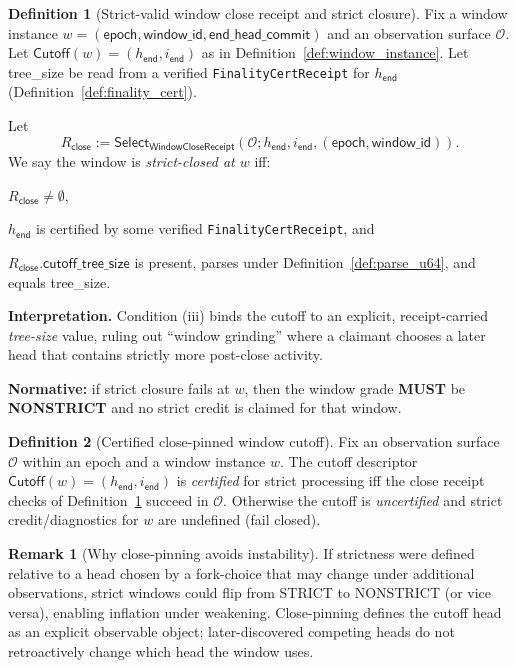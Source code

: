 \documentclass[11pt]{article}
\newcommand{\MUST}{\textbf{MUST}}
\newcommand{\code}[1]{\texttt{#1}}
\newcommand{\term}[1]{\emph{#1}}
\newcommand{\1}{\mathbf{1}}
\theoremstyle{definition}
\newtheorem{definition}{Definition}
\newtheorem{remark}{Remark}
\theoremstyle{plain}
\begin{document}
\begin{definition}[Strict-valid window close receipt and strict closure]
\label{def:window_close}
Fix a window instance $w=(\textsf{epoch},\textsf{window\_id},\textsf{end\_head\_commit})$ and an observation surface $\mathcal{O}$.
Let $\textsf{Cutoff}(w)=(h_{\textsf{end}},i_{\textsf{end}})$ as in Definition~\ref{def:window_instance}.
Let \textsf{tree\_size} be read from a verified \code{FinalityCertReceipt} for $h_{\textsf{end}}$ (Definition~\ref{def:finality_cert}).

Let
\[
R_{\textsf{close}}:=\mathsf{Select}_{\textsf{WindowCloseReceipt}}(\mathcal{O};h_{\textsf{end}},i_{\textsf{end}},(\textsf{epoch},\textsf{window\_id})).
\]
We say the window is \term{strict-closed at $w$} iff:
\begin{tightitemize}
\item[(i)] $R_{\textsf{close}}\ne\emptyset$,
\item[(ii)] $h_{\textsf{end}}$ is certified by some verified \code{FinalityCertReceipt}, and
\item[(iii)] $R_{\textsf{close}}.\textsf{cutoff\_tree\_size}$ is present, parses under Definition~\ref{def:parse_u64}, and equals \textsf{tree\_size}.
\end{tightitemize}

\textbf{Interpretation.} Condition (iii) binds the cutoff to an explicit, receipt-carried \emph{tree-size} value, ruling out ``window grinding'' where a claimant chooses a later head that contains strictly more post-close activity.

\textbf{Normative:} if strict closure fails at $w$, then the window grade \MUST{} be \textbf{NONSTRICT} and no strict credit is claimed for that window.
\end{definition}

\begin{definition}[Certified close-pinned window cutoff]
\label{def:cutoff}
Fix an observation surface $\mathcal{O}$ within an epoch and a window instance $w$.
The cutoff descriptor $\textsf{Cutoff}(w)=(h_{\textsf{end}},i_{\textsf{end}})$ is \term{certified} for strict processing iff
the close receipt checks of Definition~\ref{def:window_close} succeed in $\mathcal{O}$.
Otherwise the cutoff is \term{uncertified} and strict credit/diagnostics for $w$ are undefined (fail closed).
\end{definition}

\begin{remark}[Why close-pinning avoids instability]
If strictness were defined relative to a head chosen by a fork-choice that may change under additional observations, strict windows could flip from STRICT to NONSTRICT (or vice versa), enabling inflation under weakening. Close-pinning defines the cutoff head as an explicit observable object; later-discovered competing heads do not retroactively change which head the window uses.
\end{remark}
\end{document}
